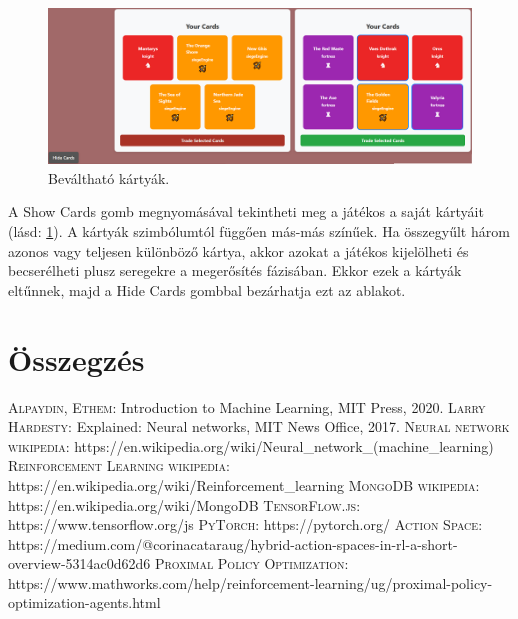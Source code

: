 \documentclass[
]{thesis-ekf}
\theoremstyle{definition}
\theoremstyle{remark}
\begin{document}
	\begin{figure}[ht!]
		\centering
		\includegraphics[width=16cm]{kartyak.png}
		\caption{Beváltható kártyák.}
		\label{kartyak}
	\end{figure}
	
	A Show Cards gomb megnyomásával tekintheti meg a játékos a saját kártyáit (lásd: \ref{kartyak}). A kártyák szimbólumtól függően más-más színűek. Ha összegyűlt három azonos vagy teljesen különböző kártya, akkor azokat a játékos kijelölheti és becserélheti plusz seregekre a megerősítés fázisában. Ekkor ezek a kártyák eltűnnek, majd a Hide Cards gombbal bezárhatja ezt az ablakot.
	
	\chapter*{Összegzés}
	
	
	\begin{thebibliography}{2}
		\textsc{Alpaydin, Ethem}: Introduction to Machine Learning, MIT Press, 2020.
		\textsc{Larry Hardesty}: Explained: Neural networks, MIT News Office, 2017. 
		\textsc{Neural network wikipedia}: https://en.wikipedia.org/wiki/Neural\_network\_(machine\_learning)
		\textsc{Reinforcement Learning wikipedia}: https://en.wikipedia.org/wiki/Reinforcement\_learning
		\textsc{MongoDB wikipedia}: https://en.wikipedia.org/wiki/MongoDB
		\textsc{TensorFlow.js}: https://www.tensorflow.org/js
		\textsc{PyTorch}: https://pytorch.org/
		\textsc{Action Space}: https://medium.com/@corinacataraug/hybrid-action-spaces-in-rl-a-short-overview-5314ac0d62d6
		\textsc{Proximal Policy Optimization}: https://www.mathworks.com/help/reinforcement-learning/ug/proximal-policy-optimization-agents.html
	\end{thebibliography}
	
	
	
\end{document}

